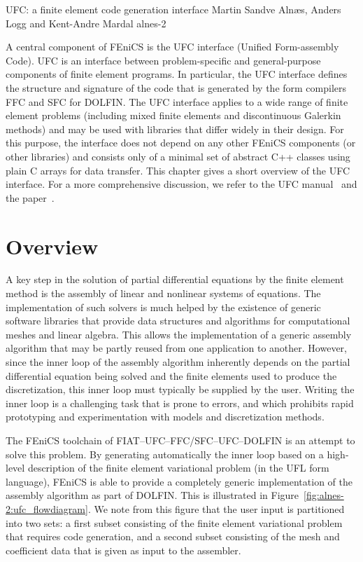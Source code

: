               {UFC: a finite element code generation interface}
              {Martin Sandve Aln\ae{}s, Anders Logg and Kent-Andre Mardal}
              {alnes-2}

A central component of FEniCS is the UFC interface (Unified
Form-assembly Code). UFC is an interface between problem-specific and
general-purpose components of finite element programs. In particular,
the UFC interface defines the structure and signature of the code that
is generated by the form compilers FFC and SFC for DOLFIN.
The UFC interface applies to a wide range of finite element problems
(including mixed finite elements and discontinuous Galerkin methods)
and may be used with libraries that differ widely in their design. For
this purpose, the interface does not depend on any other FEniCS
components (or other libraries) and consists only of a minimal set of
abstract C++ classes using plain C arrays for data transfer.
This chapter gives a short overview of the UFC interface. For a more
comprehensive discussion, we refer to the UFC
manual~\citep{AlnaesLangtangenEtAl2007} and the
paper~\citet{AlnaesLoggMardalEtAl2009}.

\section{Overview}
\label{sec:alnes-2overview}

A key step in the solution of partial differential equations by the
finite element method is the assembly of linear and nonlinear systems
of equations. The implementation of such solvers is much helped by the
existence of generic software libraries that provide data structures
and algorithms for computational meshes and linear algebra. This
allows the implementation of a generic assembly algorithm that may be
partly reused from one application to another. However, since the
inner loop of the assembly algorithm inherently depends on the partial
differential equation being solved and the finite elements used to
produce the discretization, this inner loop must typically be supplied
by the user. Writing the inner loop is a challenging task that is
prone to errors, and which prohibits rapid prototyping and
experimentation with models and discretization methods.

The FEniCS toolchain of FIAT--UFC--FFC/SFC--UFC--DOLFIN is an attempt
to solve this problem. By generating automatically the inner loop
based on a high-level description of the finite element variational
problem (in the UFL form language), FEniCS is able to provide a
completely generic implementation of the assembly algorithm as part of
DOLFIN. This is illustrated in
Figure~\ref{fig:alnes-2:ufc_flowdiagram}. We note from this figure
that the user input is partitioned into two sets: a first subset
consisting of the finite element variational problem that requires
code generation, and a second subset consisting of the mesh and
coefficient data that is given as input to the assembler.

